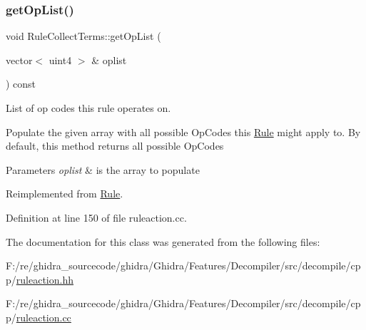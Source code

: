 \subsubsection{\texorpdfstring{getOpList()}{getOpList()}}
{\footnotesize\ttfamily void Rule\+Collect\+Terms\+::get\+Op\+List (\begin{DoxyParamCaption}\item[{vector$<$ uint4 $>$ \&}]{oplist }\end{DoxyParamCaption}) const\hspace{0.3cm}{\ttfamily [virtual]}}



List of op codes this rule operates on. 

Populate the given array with all possible Op\+Codes this \mbox{\hyperlink{class_rule}{Rule}} might apply to. By default, this method returns all possible Op\+Codes 
\begin{DoxyParams}{Parameters}
{\em oplist} & is the array to populate \\
\hline
\end{DoxyParams}


Reimplemented from \mbox{\hyperlink{class_rule_a4023bfc7825de0ab866790551856d10e}{Rule}}.



Definition at line 150 of file ruleaction.\+cc.



The documentation for this class was generated from the following files\+:\begin{DoxyCompactItemize}
\item 
F\+:/re/ghidra\+\_\+sourcecode/ghidra/\+Ghidra/\+Features/\+Decompiler/src/decompile/cpp/\mbox{\hyperlink{ruleaction_8hh}{ruleaction.\+hh}}\item 
F\+:/re/ghidra\+\_\+sourcecode/ghidra/\+Ghidra/\+Features/\+Decompiler/src/decompile/cpp/\mbox{\hyperlink{ruleaction_8cc}{ruleaction.\+cc}}\end{DoxyCompactItemize}
